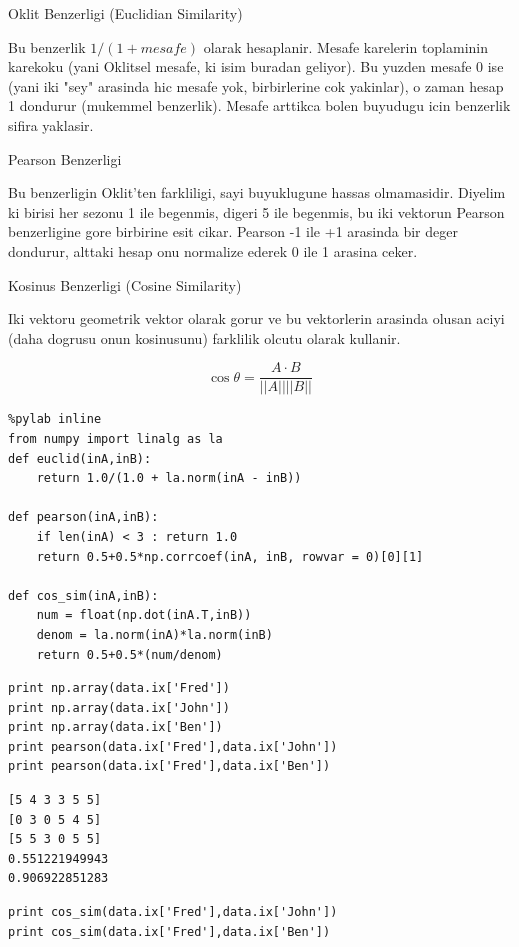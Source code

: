 \documentclass[12pt,fleqn]{article}\usepackage{../common}
\begin{document}
Oklit Benzerligi (Euclidian Similarity)

Bu benzerlik $1 / (1+mesafe)$ olarak hesaplanir. Mesafe karelerin
toplaminin karekoku (yani Oklitsel mesafe, ki isim buradan
geliyor). Bu yuzden mesafe 0 ise (yani iki "sey" arasinda hic mesafe
yok, birbirlerine cok yakinlar), o zaman hesap 1 dondurur (mukemmel
benzerlik). Mesafe arttikca bolen buyudugu icin benzerlik sifira yaklasir. 

Pearson Benzerligi

Bu benzerligin Oklit'ten farkliligi, sayi buyuklugune hassas
olmamasidir.  Diyelim ki birisi her sezonu 1 ile begenmis, digeri 5
ile begenmis, bu iki vektorun Pearson benzerligine gore birbirine esit
cikar. Pearson -1 ile +1 arasinda bir deger dondurur, alttaki hesap onu
normalize ederek 0 ile 1 arasina ceker.

Kosinus Benzerligi (Cosine Similarity)

Iki vektoru geometrik vektor olarak gorur ve bu vektorlerin arasinda
olusan aciyi (daha dogrusu onun kosinusunu) farklilik olcutu olarak
kullanir.

$$
\cos\theta = \frac{A \cdot B}{||A||||B||}
$$

\begin{verbatim}
%pylab inline
from numpy import linalg as la
def euclid(inA,inB):
    return 1.0/(1.0 + la.norm(inA - inB))

def pearson(inA,inB):
    if len(inA) < 3 : return 1.0
    return 0.5+0.5*np.corrcoef(inA, inB, rowvar = 0)[0][1]

def cos_sim(inA,inB):
    num = float(np.dot(inA.T,inB))
    denom = la.norm(inA)*la.norm(inB)
    return 0.5+0.5*(num/denom)
\end{verbatim}

\begin{verbatim}
print np.array(data.ix['Fred'])
print np.array(data.ix['John'])
print np.array(data.ix['Ben'])
print pearson(data.ix['Fred'],data.ix['John'])
print pearson(data.ix['Fred'],data.ix['Ben'])
\end{verbatim}

\begin{verbatim}
[5 4 3 3 5 5]
[0 3 0 5 4 5]
[5 5 3 0 5 5]
0.551221949943
0.906922851283
\end{verbatim}

\begin{verbatim}
print cos_sim(data.ix['Fred'],data.ix['John'])
print cos_sim(data.ix['Fred'],data.ix['Ben'])
\end{verbatim}
\end{document}

